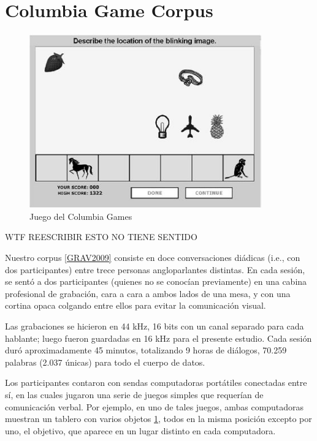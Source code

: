 \section{Columbia Game Corpus}

\begin{figure}
\centering
\includegraphics[width=10cm]{images/columbia_games.jpg}
\caption{Juego del Columbia Games}
\label{tablero_columbia_games}
\end{figure}

\newcommand{\cardgame} {\emph{Juego de cartas}}
\newcommand{\objectgame} {\emph{Juego de objetos}}

WTF REESCRIBIR ESTO NO TIENE SENTIDO

Nuestro corpus \ref{GRAV2009} consiste en doce conversaciones diádicas (i.e., con dos participantes) entre trece personas angloparlantes distintas. En cada sesión, se sentó a dos participantes (quienes no se conocían previamente) en una cabina profesional de grabación, cara a cara a ambos lados de una mesa, y con una cortina opaca colgando entre ellos para evitar la comunicación visual.


Las grabaciones se hicieron en 44 kHz, 16 bits con un canal separado para cada hablante; luego fueron guardadas en 16 kHz para el presente estudio. Cada sesión duró aproximadamente 45 minutos, totalizando 9 horas de diálogos, 70.259 palabras (2.037 únicas) para todo el cuerpo de datos.


Los participantes contaron con sendas computadoras portátiles conectadas entre sí, en las cuales jugaron una serie de juegos simples que requerían de comunicación verbal. Por ejemplo, en uno de tales juegos, ambas computadoras muestran un tablero con varios objetos \ref{tablero_columbia_games}, todos en la misma posición excepto por uno, el objetivo, que aparece en un lugar distinto en cada computadora.


